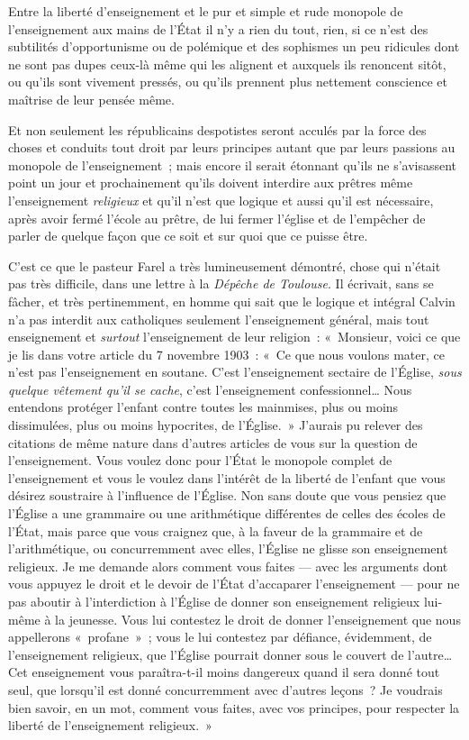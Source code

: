 \documentclass[french,twoside]{book} %
\begin{document}
Entre la liberté d’enseignement et le pur et simple et rude monopole de l’enseignement aux mains de l’État il n’y a rien du tout, rien, si ce n’est des subtilités d’opportunisme ou de polémique et des sophismes un peu ridicules dont ne sont pas dupes ceux-là même qui les alignent et auxquels ils renoncent sitôt, ou qu’ils sont vivement pressés, ou qu’ils prennent plus nettement conscience et maîtrise de leur pensée même.\par
Et non seulement les républicains despotistes seront acculés par la force des choses et conduits tout droit par leurs principes autant que par leurs passions au monopole de l’enseignement ; mais encore il serait étonnant qu’ils ne s’avisassent point un jour et prochainement qu’ils doivent interdire aux prêtres même l’enseignement {\itshape religieux} et qu’il n’est que logique et aussi qu’il est  nécessaire, après avoir fermé l’école au prêtre, de lui fermer l’église et de l’empêcher de parler de quelque façon que ce soit et sur quoi que ce puisse être.\par
C’est ce que le pasteur Farel a très lumineusement démontré, chose qui n’était pas très difficile, dans une lettre à la \emph{Dépêche de Toulouse}. Il écrivait, sans se fâcher, et très pertinemment, en homme qui sait que le logique et intégral Calvin n’a pas interdit aux catholiques seulement l’enseignement général, mais tout enseignement et {\itshape surtout} l’enseignement de leur religion : « Monsieur, voici ce que je lis dans votre article du 7 novembre 1903 : « Ce que nous voulons mater, ce n’est pas l’enseignement en soutane. C’est l’enseignement sectaire de l’Église, {\itshape sous quelque vêtement qu’il se cache}, c’est l’enseignement confessionnel… Nous entendons protéger l’enfant contre toutes les mainmises, plus ou moins dissimulées, plus ou moins hypocrites, de l’Église. » J’aurais pu relever des citations de même nature dans d’autres articles de vous sur la question de l’enseignement. Vous voulez donc pour l’État le monopole complet de l’enseignement et vous le voulez dans l’intérêt de la liberté de l’enfant que vous désirez soustraire à l’influence de l’Église. Non sans doute que vous pensiez que l’Église a une grammaire ou une  arithmétique différentes de celles des écoles de l’État, mais parce que vous craignez que, à la faveur de la grammaire et de l’arithmétique, ou concurremment avec elles, l’Église ne glisse son enseignement religieux. Je me demande alors comment vous faites — avec les arguments dont vous appuyez le droit et le devoir de l’État d’accaparer l’enseignement — pour ne pas aboutir à l’interdiction à l’Église de donner son enseignement religieux lui-même à la jeunesse. Vous lui contestez le droit de donner l’enseignement que nous appellerons « profane » ; vous le lui contestez par défiance, évidemment, de l’enseignement religieux, que l’Église pourrait donner sous le couvert de l’autre… Cet enseignement vous paraîtra-t-il moins dangereux quand il sera donné tout seul, que lorsqu’il est donné concurremment avec d’autres leçons ? Je voudrais bien savoir, en un mot, comment vous faites, avec vos principes, pour respecter la liberté de l’enseignement religieux. »\par
\end{document}
